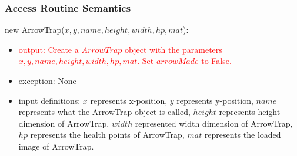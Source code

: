 \documentclass[12pt]{article}
\newcommand{\m}[1]{\mbox{#1}}
\begin{document}
\subsubsection*{Access Routine Semantics}


new ArrowTrap($x, y, name, height, width, hp, mat$):
\begin{itemize}
    \item \textcolor{red}{output: Create a $ArrowTrap$ object with the parameters $x, y, name, height, width, hp, mat$. Set $arrowMade$ to False.}
    \item exception: None
    \item input definitions: $x$ represents x-position, $y$ represents y-position, $name$ represents what the ArrowTrap object is called, $height$ represents height dimension of ArrowTrap, $width$ represented width dimension of ArrowTrap, $hp$ represents the health points of ArrowTrap, $mat$ represents the loaded image of ArrowTrap.
\end{itemize}

\end{document}
